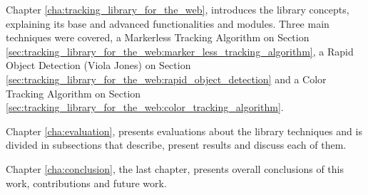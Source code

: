 Chapter \ref{cha:tracking_library_for_the_web}, introduces the library concepts, explaining its base and advanced functionalities and modules. Three main techniques were covered, a Markerless Tracking Algorithm on Section \ref{sec:tracking_library_for_the_web:marker_less_tracking_algorithm}, a Rapid Object Detection (Viola Jones) on Section \ref{sec:tracking_library_for_the_web:rapid_object_detection} and a Color Tracking Algorithm on Section \ref{sec:tracking_library_for_the_web:color_tracking_algorithm}.

Chapter \ref{cha:evaluation}, presents evaluations about the library techniques and is divided in subsections that describe, present results and discuss each of them.

Chapter \ref{cha:conclusion}, the last chapter, presents overall conclusions of this work, contributions and future work.


